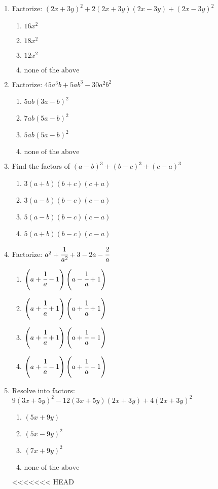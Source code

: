 \begin{multicols}{2}
\begin{enumerate}[label={\arabic*.}]
\begin{enumerate}[label={\Alph*.}]
	\end{enumerate}
\item Factorize: $(2x + 3y)^2 + 2(2x + 3y)(2x - 3y) + (2x - 3y)^2$
	\begin{enumerate}[label={\Alph*.}]
	\item \(16x^2\)
	\item \(18x^2\)
	\item \(12x^2\)
	\item \(\text{none of the above }\)
	\end{enumerate}
\item Factorize: $45a^3b + 5ab^3 -30a^2b^2$
	\begin{enumerate}[label={\Alph*.}]
	\item \(5ab(3a -b)^2\)
	\item \(7ab(5a - b)^2\)
	\item \(5ab(5a - b)^2\)
	\item \(\text{none of the above}\)
	\end{enumerate}
\item Find the factors of $(a-b)^3 + (b-c)^3 + (c-a)^3$
	\begin{enumerate}[label={\Alph*.}]
	\item \(3(a+b)(b+c)(c+a)\)
	\item \(3(a-b)(b-c)(c-a)\)
	\item \(5(a-b)(b-c)(c-a)\)
	\item \(5(a+b)(b-c)(c-a)\)
	\end{enumerate}
\item Factorize: $a^2 + \cfrac{1}{a^2} + 3 - 2a - \cfrac{2}{a}$ \\
	\begin{enumerate}[label={\Alph*.}]
	\item \(\left(a+ \cfrac{1}{a} - 1\right)\left(a - \cfrac{1}{a} + 1\right)\)
	\item \(\left(a + \cfrac{1}{a} + 1\right) \left(a+ \cfrac{1}{a} + 1\right) \)
	\item \(\left(a + \cfrac{1}{a} + 1\right) \left(a+ \cfrac{1}{a} - 1\right)\)
	\item \(\left(a + \cfrac{1}{a} - 1\right) \left(a+ \cfrac{1}{a} - 1\right)\)
	\end{enumerate}
\item Resolve into factors: $9(3x + 5y)^2 - 12(3x + 5y)(2x + 3y) + 4(2x + 3y)^2$
	\begin{enumerate}[label={\Alph*.}]
	\item \((5x + 9y)\)
	\item \((5x - 9y)^2\)
	\item \((7x + 9y)^2\)
	\item \( \text{none of the above}\)
	\end{enumerate}
<<<<<<< HEAD



\end{enumerate}
\end{multicols}
